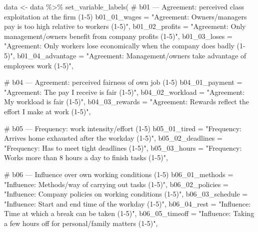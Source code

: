\documentclass[
  letterpaper,
  DIV=11,
  numbers=noendperiod]{scrreprt}
\newenvironment{Shaded}{\begin{snugshade}}{\end{snugshade}}
\newcommand{\AttributeTok}[1]{\textcolor[rgb]{0.40,0.45,0.13}{#1}}
\newcommand{\CommentTok}[1]{\textcolor[rgb]{0.37,0.37,0.37}{#1}}
\newcommand{\FunctionTok}[1]{\textcolor[rgb]{0.28,0.35,0.67}{#1}}
\newcommand{\NormalTok}[1]{\textcolor[rgb]{0.00,0.23,0.31}{#1}}
\newcommand{\OtherTok}[1]{\textcolor[rgb]{0.00,0.23,0.31}{#1}}
\newcommand{\SpecialCharTok}[1]{\textcolor[rgb]{0.37,0.37,0.37}{#1}}
\newcommand{\StringTok}[1]{\textcolor[rgb]{0.13,0.47,0.30}{#1}}
\begin{document}
\begin{Shaded}
\begin{Highlighting}[]
\NormalTok{data }\OtherTok{\textless{}{-}}\NormalTok{ data }\SpecialCharTok{\%\textgreater{}\%}
  \FunctionTok{set\_variable\_labels}\NormalTok{(}
    \CommentTok{\# b01 — Agreement: perceived class exploitation at the firm (1{-}5)}
    \AttributeTok{b01\_01\_wages       =} \StringTok{"Agreement: Owners\textquotesingle{}/managers\textquotesingle{} pay is too high relative to workers\textquotesingle{} (1{-}5)"}\NormalTok{,}
    \AttributeTok{b01\_02\_profits     =} \StringTok{"Agreement: Only management/owners benefit from company profits (1{-}5)"}\NormalTok{,}
    \AttributeTok{b01\_03\_loses       =} \StringTok{"Agreement: Only workers lose economically when the company does badly (1{-}5)"}\NormalTok{,}
    \AttributeTok{b01\_04\_advantage   =} \StringTok{"Agreement: Management/owners take advantage of employees\textquotesingle{} work (1{-}5)"}\NormalTok{,}

    \CommentTok{\# b04 — Agreement: perceived fairness of own job (1{-}5)}
    \AttributeTok{b04\_01\_payment     =} \StringTok{"Agreement: The pay I receive is fair (1{-}5)"}\NormalTok{,}
    \AttributeTok{b04\_02\_workload    =} \StringTok{"Agreement: My workload is fair (1{-}5)"}\NormalTok{,}
    \AttributeTok{b04\_03\_rewards     =} \StringTok{"Agreement: Rewards reflect the effort I make at work (1{-}5)"}\NormalTok{,}

    \CommentTok{\# b05 — Frequency: work intensity/effort (1{-}5)}
    \AttributeTok{b05\_01\_tired       =} \StringTok{"Frequency: Arrives home exhausted after the workday (1{-}5)"}\NormalTok{,}
    \AttributeTok{b05\_02\_deadlines   =} \StringTok{"Frequency: Has to meet tight deadlines (1{-}5)"}\NormalTok{,}
    \AttributeTok{b05\_03\_hours       =} \StringTok{"Frequency: Works more than 8 hours a day to finish tasks (1{-}5)"}\NormalTok{,}

    \CommentTok{\# b06 — Influence over own working conditions (1{-}5)}
    \AttributeTok{b06\_01\_methods     =} \StringTok{"Influence: Methods/way of carrying out tasks (1{-}5)"}\NormalTok{,}
    \AttributeTok{b06\_02\_policies    =} \StringTok{"Influence: Company policies on working conditions (1{-}5)"}\NormalTok{,}
    \AttributeTok{b06\_03\_schedule    =} \StringTok{"Influence: Start and end time of the workday (1{-}5)"}\NormalTok{,}
    \AttributeTok{b06\_04\_rest        =} \StringTok{"Influence: Time at which a break can be taken (1{-}5)"}\NormalTok{,}
    \AttributeTok{b06\_05\_timeoff     =} \StringTok{"Influence: Taking a few hours off for personal/family matters (1{-}5)"}\NormalTok{,}


\end{Highlighting}
\end{Shaded}
\end{document}
